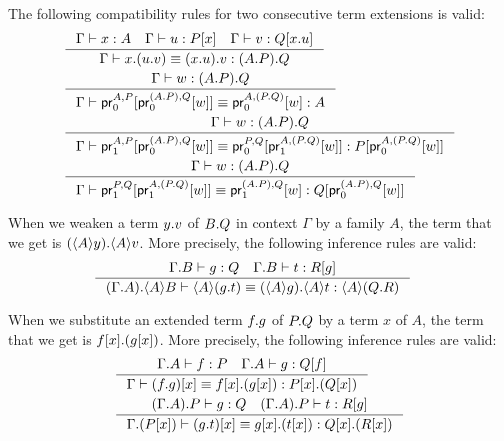 \begin{lem}
The following compatibility rules for two consecutive term extensions is valid:
\begin{align*}
& \inference{\jterm{\Gamma}{A}{x}\quad\jterm{\Gamma}{\subst{x}{P}}{u}\quad\jterm{\Gamma}{\subst{\ctxext{x}{u}}{Q}}{v}}
{\jtermeq{\Gamma}{\ctxext{{A}{P}}{Q}}{\ctxext{x}{{u}{v}}}{\ctxext{{x}{u}}{v}}}\\
& \inference{\jterm{\Gamma}{\ctxext{{A}{P}}{Q}}{w}}
  {\jtermeq{\Gamma}{A}{\cprojfst{A}{P}{\cprojfst{\ctxext{A}{P}}{Q}{w}}}{\cprojfst{A}{\ctxext{P}{Q}}{w}}}\\
& \inference{\jterm{\Gamma}{\ctxext{{A}{P}}{Q}}{w}}
  {\jtermeq{\Gamma}{\subst{\cprojfst{A}{\ctxext{P}{Q}}{w}}{P}}
  {\cprojsnd{A}{P}{\cprojfst{\ctxext{A}{P}}{Q}{w}}}
  {\cprojfst{P}{Q}{\cprojsnd{A}{\ctxext{P}{Q}}{w}}}}\\
& \inference{\jterm{\Gamma}{\ctxext{{A}{P}}{Q}}{w}}
  {\jtermeq{\Gamma}{\subst{\cprojfst{\ctxext{A}{P}}{Q}{w}}{Q}}
  {\cprojsnd{P}{Q}{\cprojsnd{A}{\ctxext{P}{Q}}{w}}}
  {\cprojsnd{\ctxext{A}{P}}{Q}{w}}}
\end{align*}
\end{lem}

\begin{lem}
When we weaken a term $\ctxext{y}{v}$ of $\ctxext{B}{Q}$ in context $\Gamma$ by
a family $A$, the term that we get is $\ctxext{\ctxwk{A}{y}}{\ctxwk{A}{v}}$. More
precisely, the following inference rules are valid:
\begin{align*}
& \inference{\jterm{\ctxext{\Gamma}{B}}{Q}{g}\quad\jterm{\ctxext{\Gamma}{B}}{\subst{g}{R}}{t}}{\jtermeq{\ctxext{{\Gamma}{A}}{\ctxwk{A}{B}}}{\ctxwk{A}{\ctxext{Q}{R}}}{\ctxwk{A}{\ctxext{g}{t}}}{\ctxext{\ctxwk{A}{g}}{\ctxwk{A}{t}}}}
\end{align*}
\end{lem}

\begin{lem}
When we substitute an extended term $\ctxext{f}{g}$ of $\ctxext{P}{Q}$ by a term
$x$ of $A$, the term that we get is $\ctxext{\subst{x}{f}}{\subst{x}{g}}$.
More precisely, the following inference rules are valid:
\begin{align*}
& \inference{\jterm{\ctxext{\Gamma}{A}}{P}{f}\quad\jterm{\ctxext{\Gamma}{A}}{\subst{f}{Q}}{g}}{\jtermeq{\Gamma}{\ctxext{\subst{x}{P}}{\subst{x}{Q}}}{\subst{x}{\ctxext{f}{g}}}{\ctxext{\subst{x}{f}}{\subst{x}{g}}}}\\
& \inference{\jterm{\ctxext{{\Gamma}{A}}{P}}{Q}{g}\quad\jterm{\ctxext{{\Gamma}{A}}{P}}{\subst{g}{R}}{t}}{\jtermeq{\ctxext{\Gamma}{\subst{x}{P}}}{\ctxext{\subst{x}{Q}}{\subst{x}{R}}}{\subst{x}{\ctxext{g}{t}}}{\ctxext{\subst{x}{g}}{\subst{x}{t}}}}
\end{align*}
\end{lem}
